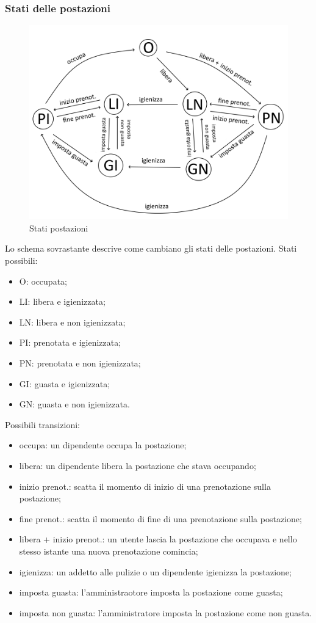 \subsubsection{Stati delle postazioni}
\begin{figure}[H]
	\centering
	\includegraphics[width=15cm]{res/images/statipostazioni.png}
	\caption{Stati postazioni}
	\label{fig:stati postazioni}
\end{figure}
Lo schema sovrastante descrive come cambiano gli stati delle postazioni. \newline
Stati possibili:
\begin{itemize}
	\item O: occupata;
	\item LI: libera e igienizzata;
	\item LN: libera e non igienizzata;
	\item PI: prenotata e igienizzata;
	\item PN: prenotata e non igienizzata;
	\item GI: guasta e igienizzata;
	\item GN: guasta e non igienizzata.
\end{itemize}
Possibili transizioni:
\begin{itemize}
	\item occupa: un dipendente occupa la postazione;
	\item libera: un dipendente libera la postazione che stava occupando;
	\item inizio prenot.: scatta il momento di inizio di una prenotazione sulla postazione;
	\item fine prenot.: scatta il momento di fine di una prenotazione sulla postazione;
	\item libera + inizio prenot.: un utente lascia la postazione che occupava e nello stesso istante una nuova prenotazione comincia;
	\item igienizza: un addetto alle pulizie o un dipendente igienizza la postazione;
	\item imposta guasta: l'amministraotore imposta la postazione come guasta;
	\item imposta non guasta: l'amministratore imposta la postazione come non guasta.
\end{itemize}

